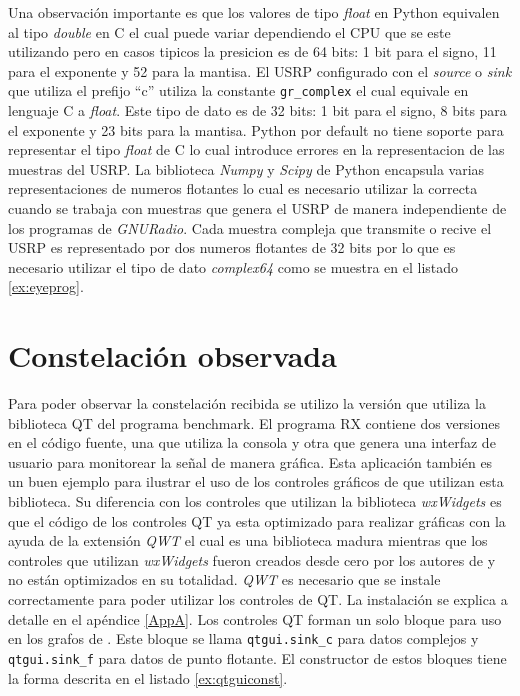 Una observaci\'on importante es que los valores de tipo \emph{float} en Python equivalen al tipo
\emph{double} en C el cual puede variar dependiendo el CPU que se este utilizando pero en casos
tipicos la presicion es de 64 bits: 1 bit para el signo, 11 para el exponente y 52 para la mantisa.
\cite{python} El USRP configurado con el \emph{source} o \emph{sink} que utiliza el prefijo ``c''
utiliza la constante \verb|gr_complex| el cual equivale en lenguaje C a \emph{float}. Este tipo de
dato es de 32 bits: 1 bit para el signo, 8 bits para el exponente y 23 bits para la mantisa. Python
por default no tiene soporte para representar el tipo \emph{float} de C lo cual introduce errores en la
representacion de las muestras del USRP. La biblioteca \emph{Numpy} y \emph{Scipy} de Python encapsula
varias representaciones de numeros flotantes \cite{scipy} lo cual es necesario utilizar la correcta
cuando se trabaja con muestras que genera el USRP de manera independiente de los programas de
\emph{GNURadio}. Cada muestra compleja que transmite o recive el USRP es representado por dos
numeros flotantes de 32 bits por lo que es necesario utilizar el tipo de dato \emph{complex64} como
se muestra en el listado \ref{ex:eyeprog}.

\section{Constelaci\'on observada}

Para poder observar la constelaci\'on recibida se utilizo la versi\'on que utiliza la biblioteca QT
del programa benchmark. El programa RX contiene dos versiones en el c\'odigo fuente, una que utiliza
la consola y otra que genera una interfaz de usuario para monitorear la se\~nal de manera gr\'afica.
Esta aplicaci\'on tambi\'en es un buen ejemplo para ilustrar el uso de los controles gr\'aficos de
\gnuradio que utilizan esta biblioteca. Su diferencia con los controles que utilizan la biblioteca
\emph{wxWidgets} es que el c\'odigo de los controles QT ya esta optimizado para realizar gr\'aficas
con la ayuda de la extensi\'on \emph{QWT} el cual es una biblioteca madura mientras que los
controles que utilizan \emph{wxWidgets} fueron creados desde cero por los autores de \gnuradio y no
est\'an optimizados en su totalidad. \emph{QWT} es necesario que se instale correctamente para poder
utilizar los controles de QT. La instalaci\'on se explica a detalle en el ap\'endice \ref{AppA}. Los
controles QT forman un solo bloque para uso en los grafos de \gnuradio. Este bloque se llama
\verb|qtgui.sink_c| para datos complejos y \verb|qtgui.sink_f| para datos de punto flotante. El
constructor de estos bloques tiene la forma descrita en el listado \ref{ex:qtguiconst}.

